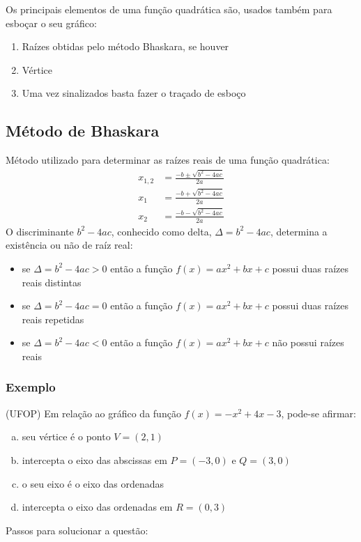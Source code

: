 \begin{multicols*}{2}
\begin{itemize}[wide, labelwidth=!, labelindent=0pt]
\begin{figure}[H]
              \end{figure}
              Os principais elementos de uma função quadrática são, usados também para esboçar o seu gráfico:
              \begin{enumerate}
                  \item Raízes obtidas pelo método Bhaskara, se houver
                  \item Vértice
                  \item Uma vez sinalizados basta fazer o traçado de esboço
              \end{enumerate}
              \subsection*{Método de Bhaskara}
              Método utilizado para determinar as raízes reais de uma função quadrática:
              \begin{align*}
                  x_{1,2} &= \frac{- b \pm \sqrt{b^2 - 4ac} }{2a} \\[1ex]
                  x_1 &= \frac{- b + \sqrt{b^2 - 4ac} }{2a}\\[1ex]
                  x_2 &= \frac{- b - \sqrt{b^2 - 4ac} }{2a}
              \end{align*}
              O discriminante $b^2 - 4ac$, conhecido como delta, $\Delta = b^2 - 4ac$, determina a existência 		ou não de raíz real:
              \begin{itemize}
                  \item se $\Delta = b^2 - 4ac > 0 $ então a função $f(x) = ax^2 + bx + c$ possui duas raízes 			reais distintas
                  \item se $\Delta = b^2 - 4ac = 0 $ então a função $f(x) = ax^2 + bx + c$ possui duas raízes 			reais repetidas
                  \item se $\Delta = b^2 - 4ac < 0 $  então a função $f(x) = ax^2 + bx + c$ não possui raízes 			reais
              \end{itemize}
    \end{itemize}
    \subsubsection*{Exemplo}

    \execnum (UFOP) Em relação ao gráfico da função $f(x) = -x^2 + 4x -3$, pode-se afirmar:
    \begin{enumerate}[(a)]
         uma parábola com concavidade para cima
        \item seu vértice é o ponto $V = (2,1)$
        \item intercepta o eixo das abscissas em  $P = (-3,0)$ e $Q = (3,0)$
        \item o seu eixo é o eixo das ordenadas
        \item intercepta o eixo das ordenadas em $R = (0,3)$
    \end{enumerate}
    Passos para solucionar a questão:


\end{multicols*}
